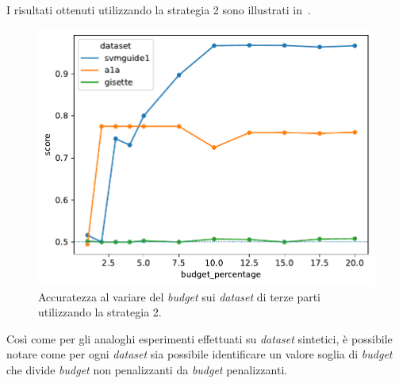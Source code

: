 I risultati ottenuti utilizzando la strategia 2 sono illustrati in~.
\begin{figure}
    \centering
    \includegraphics[width=0.5\linewidth]{img//TP/tp_new_strategy.pdf}
    \caption[Risultati su \emph{dataset} di terze parti utilizzando la strategia 2.]{Accuratezza al variare del \emph{budget} sui \emph{dataset} di terze parti utilizzando la strategia 2.}
    \label{fig:TP_new_strategy}
\end{figure}
Così come per gli analoghi esperimenti effettuati su \emph{dataset} sintetici, è possibile notare come per ogni \emph{dataset} sia possibile identificare un valore soglia di \emph{budget} che divide \emph{budget} non penalizzanti da \emph{budget} penalizzanti.

